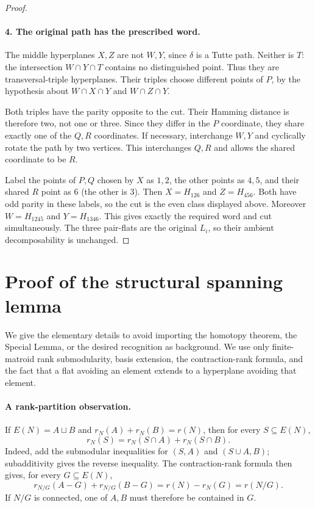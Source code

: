 \documentclass[11pt]{article}
\begin{document}
\begin{proof}
\paragraph{4. The original path has the prescribed word.}
The middle hyperplanes $X,Z$ are not $W,Y$, since $\delta$ is a Tutte path. Neither is $T$: the intersection $W\cap Y\cap T$ contains no distinguished point. Thus they are transversal-triple hyperplanes. Their triples choose different points of $P$, by the hypothesis about $W\cap X\cap Y$ and $W\cap Z\cap Y$.

Both triples have the parity opposite to the cut. Their Hamming distance is therefore two, not one or three. Since they differ in the $P$ coordinate, they share exactly one of the $Q,R$ coordinates. If necessary, interchange $W,Y$ and cyclically rotate the path by two vertices. This interchanges $Q,R$ and allows the shared coordinate to be $R$.

Label the points of $P,Q$ chosen by $X$ as $1,2$, the other points as $4,5$, and their shared $R$ point as $6$ (the other is $3$). Then $X=H_{126}$ and $Z=H_{456}$. Both have odd parity in these labels, so the cut is the even class displayed above. Moreover $W=H_{1245}$ and $Y=H_{1346}$. This gives exactly the required word and cut simultaneously. The three pair-flats are the original $L_i$, so their ambient decomposability is unchanged.
\end{proof}

\appendix
\section{Proof of the structural spanning lemma}\label{app:span}
We give the elementary details to avoid importing the homotopy theorem, the Special Lemma, or the desired recognition as background. We use only finite-matroid rank submodularity, basis extension, the contraction-rank formula, and the fact that a flat avoiding an element extends to a hyperplane avoiding that element.

\paragraph{A rank-partition observation.}
If $E(N)=A\sqcup B$ and $r_N(A)+r_N(B)=r(N)$, then for every $S\subseteq E(N)$,
\[
 r_N(S)=r_N(S\cap A)+r_N(S\cap B).
\]
Indeed, add the submodular inequalities for $(S,A)$ and $(S\cup A,B)$; subadditivity gives the reverse inequality. The contraction-rank formula then gives, for every $G\subseteq E(N)$,
\[
 r_{N/G}(A-G)+r_{N/G}(B-G)=r(N)-r_N(G)=r(N/G).
\]
If $N/G$ is connected, one of $A,B$ must therefore be contained in $G$.
\end{document}
